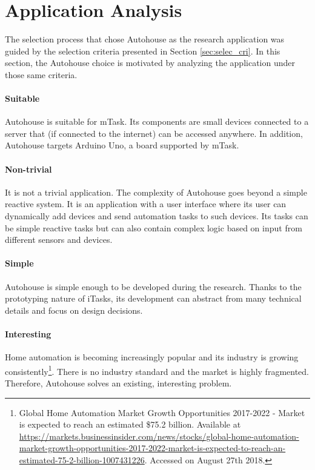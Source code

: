 \section{Application Analysis}\label{sec:app_analysis}

The selection process that chose Autohouse as the research application was guided by the selection criteria presented in Section \ref{sec:selec_cri}. In this section, the Autohouse choice is motivated by analyzing the application under those same criteria.

\paragraph{Suitable} Autohouse is suitable for mTask. Its components are small devices connected to a server that (if connected to the internet) can be accessed anywhere. In addition, Autohouse targets Arduino Uno, a board supported by mTask.

\paragraph{Non-trivial} It is not a trivial application. The complexity of Autohouse goes beyond a simple reactive system. It is an application with a user interface where its user can dynamically add devices and send automation tasks to such devices. Its tasks can be simple reactive tasks but can also contain complex logic based on input from different sensors and devices.

\paragraph{Simple} Autohouse is  simple enough to be developed during the research. Thanks to the prototyping nature of iTasks, its development can abstract from many technical details and focus on design decisions.

\paragraph{Interesting} Home automation is becoming increasingly popular and its industry is growing consistently\footnote{Global Home Automation Market Growth Opportunities 2017-2022 - Market is expected to reach an estimated \$75.2 billion. Available at \url{https://markets.businessinsider.com/news/stocks/global-home-automation-market-growth-opportunities-2017-2022-market-is-expected-to-reach-an-estimated-75-2-billion-1007431226}. Accessed on August 27th 2018.}. There is no industry standard and the market is highly fragmented. Therefore, Autohouse solves an existing, interesting problem.

